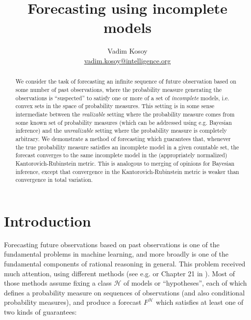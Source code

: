 \documentclass[11pt]{article}
\theoremstyle{definition}
\theoremstyle{plain}
\newcommand{\MC}{\mathcal{H}}
\begin{document}
\title{Forecasting using incomplete models}
\author{Vadim Kosoy \\ \href{mailto:vadim.kosoy@intelligence.org}{vadim.kosoy@intelligence.org}}
\date{}%
\maketitle

\begin{abstract}
We consider the task of forecasting an infinite sequence of future observation based on some number of past observations, where the probability measure generating the observations is \enquote{suspected} to satisfy one or more of a set of \emph{incomplete} models, i.e. convex sets in the space of probability measures. This setting is in some sense intermediate between the \emph{realizable} setting where the probability measure comes from some known set of probability measures (which can be addressed using e.g. Bayesian inference) and the \emph{unrealizable} setting where the probability measure is completely arbitrary. We demonstrate a method of forecasting which guarantees that, whenever the true probability measure satisfies an incomplete model in a given countable set, the forecast converges to the same incomplete model in the (appropriately normalized) Kantorovich-Rubinstein metric. This is analogous to merging of opinions for Bayesian inference, except that convergence in the  Kantorovich-Rubinstein metric is weaker than convergence in total variation.
\end{abstract}


\section{Introduction}

Forecasting future observations based on past observations is one of the fundamental problems in machine learning, and more broadly is one of the fundamental components of rational reasoning in general. This problem received much attention, using different methods (see e.g. \cite{Cesa-Bianchi_2006} or Chapter 21 in \cite{Shalev-Shwartz_2014}). Most of those methods assume fixing a class $\MC$ of models or \enquote{hypotheses}, each of which defines a probability measure on sequences of observations (and also conditional probability measures), and produce a forecast $F^\MC$ which satisfies at least one of two kinds of guarantees:
\end{document}
